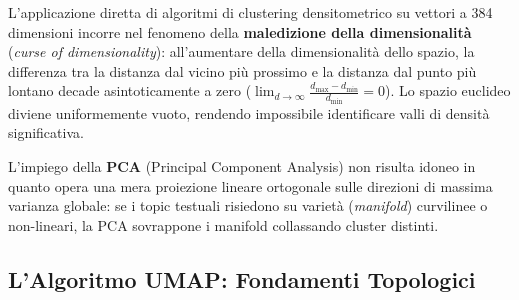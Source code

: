 L'applicazione diretta di algoritmi di clustering densitometrico su vettori a 384 dimensioni incorre nel fenomeno della \textbf{maledizione della dimensionalità} (\textit{curse of dimensionality}): all'aumentare della dimensionalità dello spazio, la differenza tra la distanza dal vicino più prossimo e la distanza dal punto più lontano decade asintoticamente a zero ($\lim_{d \to \infty} \frac{d_{\max} - d_{\min}}{d_{\min}} = 0$). Lo spazio euclideo diviene uniformemente vuoto, rendendo impossibile identificare valli di densità significativa.

L'impiego della \textbf{PCA} (Principal Component Analysis) non risulta idoneo in quanto opera una mera proiezione lineare ortogonale sulle direzioni di massima varianza globale: se i topic testuali risiedono su varietà (\textit{manifold}) curvilinee o non-lineari, la PCA sovrappone i manifold collassando cluster distinti.

\FloatBarrier
\subsection{L'Algoritmo UMAP: Fondamenti Topologici}
\label{subsec:lab-umap-algorithm}


